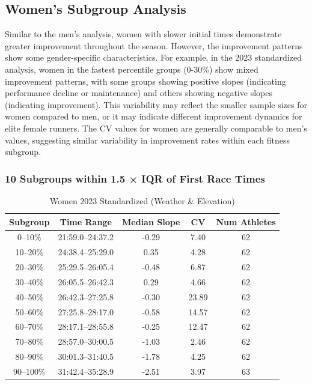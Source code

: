 \documentclass[suppldata]{interact}
\theoremstyle{plain}%
\theoremstyle{definition}
\theoremstyle{remark}
\begin{document}
\clearpage
\subsection{Women's Subgroup Analysis}
\label{app:subgroup_women}

Similar to the men's analysis, women with slower initial times demonstrate greater improvement throughout the season. However, the improvement patterns show some gender-specific characteristics. For example, in the 2023 standardized analysis, women in the fastest percentile groups (0-30\%) show mixed improvement patterns, with some groups showing positive slopes (indicating performance decline or maintenance) and others showing negative slopes (indicating improvement). This variability may reflect the smaller sample sizes for women compared to men, or it may indicate different improvement dynamics for elite female runners. The CV values for women are generally comparable to men's values, suggesting similar variability in improvement rates within each fitness subgroup.

\subsubsection*{10 Subgroups within 1.5 × IQR of First Race Times}

\begin{table}[htbp]
\renewcommand{\arraystretch}{1.2}
\begin{tabular}{c c c c c}
\toprule
Subgroup& Time Range & Median Slope & CV& Num Athletes \\
\midrule
0--10\%   & 21:59.0--24:37.2 & -0.29 & 7.40   & 62 \\
    10--20\%  & 24:38.4--25:29.0 &  0.35 & 4.28   & 62 \\
    20--30\%  & 25:29.5--26:05.4 & -0.48 & 6.87   & 62 \\
    30--40\%  & 26:05.5--26:42.3 &  0.29 & 4.66   & 62 \\
    40--50\%  & 26:42.3--27:25.8 & -0.30 & 23.89  & 62 \\
    50--60\%  & 27:25.8--28:17.0 & -0.58 & 14.57  & 62 \\
    60--70\%  & 28:17.1--28:55.8 & -0.25 & 12.47  & 62 \\
    70--80\%  & 28:57.0--30:00.5 & -1.03 & 2.46   & 62 \\
    80--90\%  & 30:01.3--31:40.5 & -1.78 & 4.25   & 62 \\
    90--100\% & 31:42.4--35:28.9 & -2.51 & 3.97   & 63 \\
\bottomrule
\end{tabular}
\centering
\caption{Women 2023 Standardized (Weather \& Elevation)}
\label{tab:women_2023_stand}
\end{table}
\end{document}
